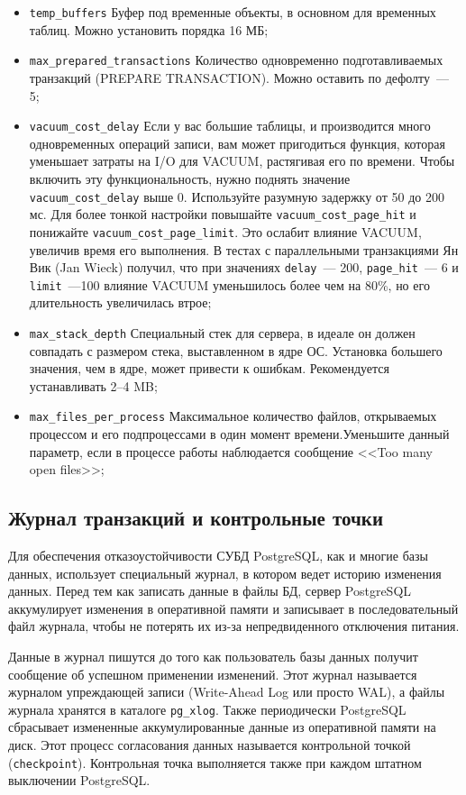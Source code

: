 \begin{itemize}
  \item \lstinline!temp_buffers! Буфер под временные объекты, в основном для временных таблиц. Можно установить порядка 16 МБ;
  \item \lstinline!max_prepared_transactions! Количество одновременно подготавливаемых транзакций (PREPARE TRANSACTION). Можно оставить по дефолту~--- 5;
  \item \lstinline!vacuum_cost_delay! Если у вас большие таблицы, и производится много одновременных операций записи, вам может пригодиться функция, которая уменьшает затраты на I/O для VACUUM, растягивая его по времени. Чтобы включить эту функциональность, нужно поднять значение \lstinline!vacuum_cost_delay! выше 0. Используйте разумную задержку от 50 до 200 мс. Для более тонкой настройки повышайте \lstinline!vacuum_cost_page_hit! и понижайте \lstinline!vacuum_cost_page_limit!. Это ослабит влияние VACUUM, увеличив время его выполнения. В тестах с параллельными транзакциями Ян Вик (Jan Wieck) получил, что при значениях \lstinline!delay!~--- 200, \lstinline!page_hit!~--- 6 и \lstinline!limit!~---100 влияние VACUUM уменьшилось более чем на 80\%, но его длительность увеличилась втрое;
  \item \lstinline!max_stack_depth! Специальный стек для сервера, в идеале он должен совпадать с размером стека, выставленном в ядре ОС. Установка большего значения, чем в ядре, может привести к ошибкам. Рекомендуется устанавливать 2--4 MB;
  \item \lstinline!max_files_per_process! Максимальное количество файлов, открываемых процессом и его подпроцессами в один момент времени.Уменьшите данный параметр, если в процессе работы наблюдается сообщение <<Too many open files>>;
\end{itemize}


\subsection{Журнал транзакций и контрольные точки}


Для обеспечения отказоустойчивости СУБД PostgreSQL, как и многие базы данных, использует специальный журнал, в котором ведет историю изменения данных. Перед тем как записать данные в файлы БД, сервер PostgreSQL аккумулирует изменения в оперативной памяти и записывает в последовательный файл журнала, чтобы не потерять их из-за непредвиденного отключения питания.

Данные в журнал пишутся до того как пользователь базы данных получит сообщение об успешном применении изменений. Этот журнал называется журналом упреждающей записи (Write-Ahead Log или просто WAL), а файлы журнала хранятся в каталоге \lstinline!pg_xlog!. Также периодически PostgreSQL сбрасывает измененные аккумулированные данные из оперативной памяти на диск. Этот процесс согласования данных называется контрольной точкой (\lstinline!checkpoint!). Контрольная точка выполняется также при каждом штатном выключении PostgreSQL.

